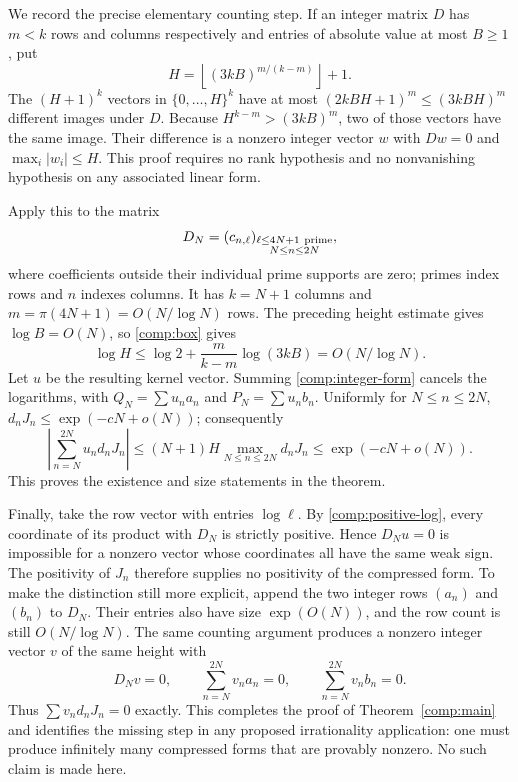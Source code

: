 \documentclass[11pt,a4paper]{article}
\theoremstyle{definition}\newtheorem{definition}[theorem]{Definition}
\theoremstyle{remark}\newtheorem{remark}[theorem]{Remark}
\newcommand{\N}{\mathbb N}
\begin{document}
We record the precise elementary counting step.  If an integer matrix
$D$ has $m<k$ rows and columns respectively and entries of absolute value
at most $B\geq1$, put
\begin{equation}\label{comp:box}
 H=\left\lfloor(3kB)^{m/(k-m)}\right\rfloor+1.
\end{equation}
The $(H+1)^k$ vectors in $\{0,\ldots,H\}^k$ have at most
$(2kBH+1)^m\leq(3kBH)^m$ different images under $D$.
Because $H^{k-m}>(3kB)^m$, two of those vectors have the same image.
Their difference is a nonzero integer vector $w$ with $Dw=0$ and
$\max_i|w_i|\leq H$.  This proof requires no rank hypothesis and no
nonvanishing hypothesis on any associated linear form.

Apply this to the matrix
\[
 D_N=(c_{n,\ell})_{
 \substack{\ell\leq4N+1\ {\rm prime}\\N\leq n\leq2N}},
\]
where coefficients outside their individual prime supports are zero;
primes index rows and $n$ indexes columns.  It has
$k=N+1$ columns and
$m=\pi(4N+1)=O(N/\log N)$ rows.  The preceding height estimate gives
$\log B=O(N)$, so \eqref{comp:box} gives
\[
 \log H\leq\log2+\frac{m}{k-m}\log(3kB)
          =O(N/\log N).
\]
Let $u$ be the resulting kernel vector.  Summing
\eqref{comp:integer-form} cancels the logarithms, with
$Q_N=\sum u_na_n$ and $P_N=\sum u_nb_n$.
Uniformly for $N\leq n\leq2N$,
$d_nJ_n\leq\exp(-cN+o(N))$; consequently
\[
 \left|\sum_{n=N}^{2N}u_nd_nJ_n\right|
 \leq(N+1)H\max_{N\leq n\leq2N}d_nJ_n
 \leq\exp(-cN+o(N)).
\]
This proves the existence and size statements in the theorem.

Finally, take the row vector with entries $\log\ell$.
By \eqref{comp:positive-log}, every coordinate of its product with $D_N$
is strictly positive.  Hence $D_Nu=0$ is impossible for a nonzero vector
whose coordinates all have the same weak sign.  The positivity of
$J_n$ therefore supplies no positivity of the compressed form.
To make the distinction still more explicit, append the two integer
rows $(a_n)$ and $(b_n)$ to $D_N$.  Their entries also have size
$\exp(O(N))$, and the row count is still $O(N/\log N)$.
The same counting argument produces a nonzero integer vector $v$ of
the same height with
\[
 D_Nv=0,\qquad\sum_{n=N}^{2N}v_na_n=0,
 \qquad\sum_{n=N}^{2N}v_nb_n=0.
\]
Thus $\sum v_nd_nJ_n=0$ exactly.  This completes the proof of
Theorem~\ref{comp:main} and identifies the missing step in any proposed
irrationality application: one must produce infinitely many compressed
forms that are provably nonzero.  No such claim is made here.
\end{document}
